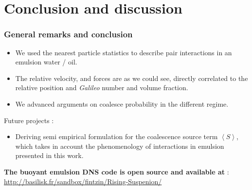 \documentclass{sintefbeamer}
\newcommand{\avg}[1]{\left<#1\right>}
\begin{document}
\section{Conclusion and discussion}
\begin{frame}
  \frametitle{General remarks and conclusion}

  \begin{itemize}
    \item We used the nearest particle statistics to describe pair interactions in an emulsion water / oil. 
    \item The relative velocity, and forces are as we could see, directly correlated to the relative position and \textit{Galileo} number and volume fraction. 
    \item We advanced arguments on coalesce probability in the different regime. 
  \end{itemize}
  Future projects :   
  \begin{itemize}
    \item Deriving semi empirical formulation for the coalescence source term $\avg{S}$, which takes in account the phenomenology of interactions in emulsion presented in this work. 
  \end{itemize}

\vspace{1cm}
\textbf{The buoyant emulsion DNS code is open source and available at} : 
\url{http://basilisk.fr/sandbox/fintzin/Rising-Suspenion/}
\end{frame}
\end{document}
